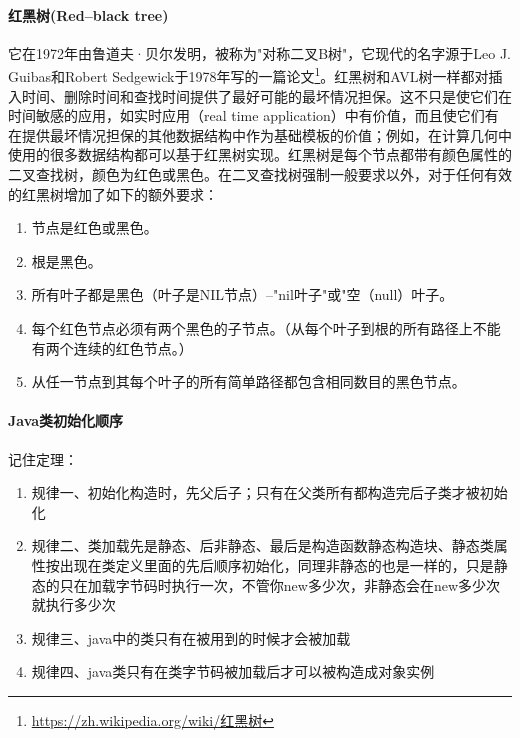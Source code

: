\documentclass[../../../interview-questions.tex]{subfiles}
\begin{document}
\paragraph{红黑树(Red–black tree)}

它在1972年由鲁道夫·贝尔发明，被称为"对称二叉B树"，它现代的名字源于Leo J. Guibas和Robert Sedgewick于1978年写的一篇论文\footnote{\url{https://zh.wikipedia.org/wiki/红黑树}}。红黑树和AVL树一样都对插入时间、删除时间和查找时间提供了最好可能的最坏情况担保。这不只是使它们在时间敏感的应用，如实时应用（real time application）中有价值，而且使它们有在提供最坏情况担保的其他数据结构中作为基础模板的价值；例如，在计算几何中使用的很多数据结构都可以基于红黑树实现。红黑树是每个节点都带有颜色属性的二叉查找树，颜色为红色或黑色。在二叉查找树强制一般要求以外，对于任何有效的红黑树增加了如下的额外要求：

\begin{enumerate}
\item {节点是红色或黑色。}
\item{根是黑色。}
\item{所有叶子都是黑色（叶子是NIL节点）--"nil叶子"或"空（null）叶子。}
\item{每个红色节点必须有两个黑色的子节点。（从每个叶子到根的所有路径上不能有两个连续的红色节点。）}
\item{从任一节点到其每个叶子的所有简单路径都包含相同数目的黑色节点。}
\end{enumerate}






\paragraph{Java类初始化顺序}

记住定理：

\begin{enumerate}
\item{规律一、初始化构造时，先父后子；只有在父类所有都构造完后子类才被初始化}
\item{规律二、类加载先是静态、后非静态、最后是构造函数}静态构造块、静态类属性按出现在类定义里面的先后顺序初始化，同理非静态的也是一样的，只是静态的只在加载字节码时执行一次，不管你new多少次，非静态会在new多少次就执行多少次
\item{规律三、java中的类只有在被用到的时候才会被加载}
\item{规律四、java类只有在类字节码被加载后才可以被构造成对象实例}
\end{enumerate}
\end{document}
